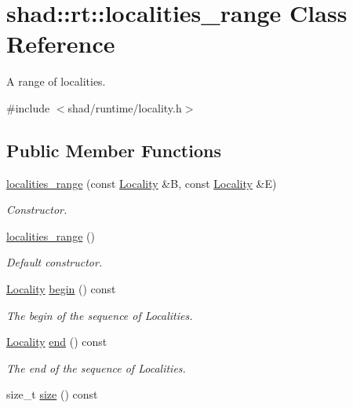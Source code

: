 \hypertarget{classshad_1_1rt_1_1localities__range}{\section{shad\-:\-:rt\-:\-:localities\-\_\-range Class Reference}
\label{classshad_1_1rt_1_1localities__range}
}


A range of localities.  




{\ttfamily \#include $<$shad/runtime/locality.\-h$>$}

\subsection*{Public Member Functions}
\begin{DoxyCompactItemize}
\item 
\hyperlink{classshad_1_1rt_1_1localities__range_ab24c18cec6af13de3ef2dd91340c229b}{localities\-\_\-range} (const \hyperlink{classshad_1_1rt_1_1Locality}{Locality} \&B, const \hyperlink{classshad_1_1rt_1_1Locality}{Locality} \&E)
\begin{DoxyCompactList}\small\item\em Constructor. \end{DoxyCompactList}\item 
\hyperlink{classshad_1_1rt_1_1localities__range_aa2ecd01c310baf67b5527e5a518b8d48}{localities\-\_\-range} ()
\begin{DoxyCompactList}\small\item\em Default constructor. \end{DoxyCompactList}\item 
\hyperlink{classshad_1_1rt_1_1Locality}{Locality} \hyperlink{classshad_1_1rt_1_1localities__range_a8e549ee86cee3f6244bb0a55810d8125}{begin} () const 
\begin{DoxyCompactList}\small\item\em The begin of the sequence of Localities. \end{DoxyCompactList}\item 
\hyperlink{classshad_1_1rt_1_1Locality}{Locality} \hyperlink{classshad_1_1rt_1_1localities__range_a234344eccd352231b8293c21dfcbebbd}{end} () const 
\begin{DoxyCompactList}\small\item\em The end of the sequence of Localities. \end{DoxyCompactList}\item 
size\-\_\-t \hyperlink{classshad_1_1rt_1_1localities__range_a439ee94a3b04f87e0d79c5947636ce5c}{size} () const 
\end{DoxyCompactItemize}



